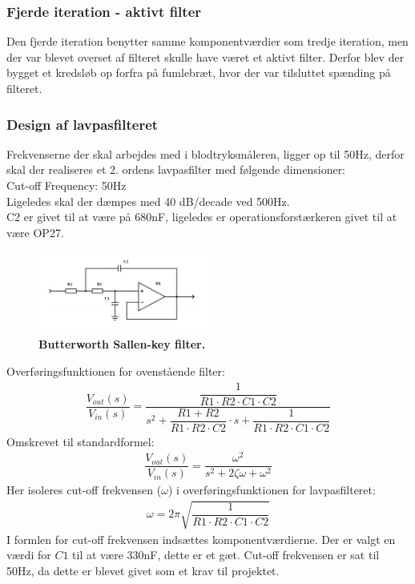 \subsubsection{Fjerde iteration - aktivt filter}
Den fjerde iteration benytter samme komponentværdier som tredje iteration, men der var blevet overset af filteret skulle have været et aktivt filter. Derfor blev der bygget et kredsløb op forfra på fumlebræt, hvor der var tilsluttet spænding på filteret.
\subsubsection{Design af lavpasfilteret}
Frekvenserne der skal arbejdes med i blodtryksmåleren, ligger op til 50Hz, derfor skal der realiseres et 2. ordens lavpasfilter med følgende dimensioner:\\
Cut-off Frequency: 50Hz\\
Ligeledes skal der dæmpes med 40 dB/decade ved 500Hz.\\
C2 er givet til at være på 680nF, ligeledes er operationsforstærkeren givet til at være OP27.
\begin{figure}[H]
\includegraphics[width =0.5\textwidth , center]{billeder/lavpas}
\caption{\textbf{Butterworth Sallen-key filter.}}
\end{figure}
Overføringsfunktionen for ovenstående filter:
\begin{align}
\dfrac{V_{out}(s)}{V_{in}(s)}=\dfrac{\dfrac{1}{R1\cdot R2\cdot C1\cdot C2}}{s^2+\dfrac{R1 + R2}{R1\cdot R2\cdot C2}\cdot s+\dfrac{1}{R1\cdot R2\cdot C1\cdot C2}}
\end{align}
Omskrevet til standardformel:
\begin{align}
\dfrac{V_{out}(s)}{V_{in}(s)}=\dfrac{\omega^2}{s^2+2\zeta\omega+\omega^2}
\end{align}
Her isoleres cut-off frekvensen ($\omega$) i overføringsfunktionen for lavpasfilteret:
\begin{align}
\omega = 2\pi\sqrt{\dfrac{1}{R1\cdot R2\cdot C1\cdot C2}}
\end{align}
I formlen for cut-off frekvensen indsættes komponentværdierne. Der er valgt en værdi for $C1$ til at være 330nF, dette er et gæt. Cut-off frekvensen er sat til 50Hz, da dette er blevet givet som et krav til projektet.\\
